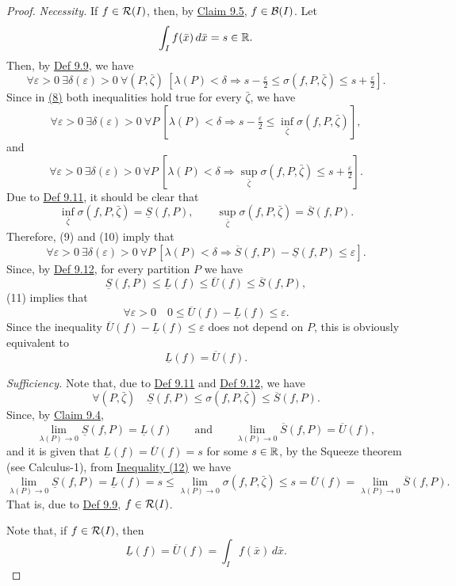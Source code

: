 \begin{proof}
\emph{Necessity.} If $f\in\mathcal{R}(I)$, then, by \hyperref[claim:9.5]{Claim 9.5}, $f\in\mathcal{B}(I)$.
Let
\[
\int_I f(\bar x)\,d\bar x=s\in\mathbb{R}.
\]
Then, by \hyperref[def:9.9]{Def 9.9}, we have
\[
\forall\varepsilon>0\ \exists\delta(\varepsilon)>0\ \forall(P,\bar\zeta)\
[\lambda(P)<\delta\Rightarrow s-\tfrac{\varepsilon}{2}\leq\sigma(f,P,\bar\zeta)\leq s+\tfrac{\varepsilon}{2}].
\tag{8}\label{eq:9:8:1}
\]
Since in \hyperref[eq:9:8:1]{(8)} both inequalities hold true for every $\bar\zeta$, we have
\[
\forall\varepsilon>0\ \exists\delta(\varepsilon)>0\ \forall P\
[\lambda(P)<\delta\Rightarrow s-\tfrac{\varepsilon}{2}\leq\inf_{\bar\zeta}\sigma(f,P,\bar\zeta)],
\tag{9}\label{eq:9:9:1}
\]
and
\[
\forall\varepsilon>0\ \exists\delta(\varepsilon)>0\ \forall P\
[\lambda(P)<\delta\Rightarrow \sup_{\bar\zeta}\sigma(f,P,\bar\zeta)\leq s+\tfrac{\varepsilon}{2}].
\tag{10}\label{eq:9:10:1}
\]
Due to \hyperref[def:9.11]{Def 9.11}, it should be clear that
\[
\inf_{\bar\zeta}\sigma(f,P,\bar\zeta)=\underline{S}(f,P),
\qquad
\sup_{\bar\zeta}\sigma(f,P,\bar\zeta)=\overline{S}(f,P).
\]
Therefore, (9) and (10) imply that
\[
\forall\varepsilon>0\ \exists\delta(\varepsilon)>0\ \forall P\
[\lambda(P)<\delta\Rightarrow \overline{S}(f,P)-\underline{S}(f,P)\leq\varepsilon].
\tag{11}\label{eq:9:11:1}
\]
Since, by \hyperref[def:9.12]{Def 9.12}, for every partition $P$ we have
\[
\underline{S}(f,P)\leq\underline{L}(f)\leq\overline{U}(f)\leq\overline{S}(f,P),
\]
(11) implies that
\[
\forall\varepsilon>0\quad 0\leq\overline{U}(f)-\underline{L}(f)\leq\varepsilon.
\]
Since the inequality $\overline{U}(f)-\underline{L}(f)\leq\varepsilon$ does not depend on $P$, this is obviously equivalent to
\[
\underline{L}(f)=\overline{U}(f).
\]

\emph{Sufficiency.} Note that, due to \hyperref[def:9.11]{Def 9.11} and \hyperref[def:9.12]{Def 9.12}, we have
\[
\forall(P,\bar\zeta)\quad
\underline{S}(f,P)\leq\sigma(f,P,\bar\zeta)\leq\overline{S}(f,P).
\tag{12}\label{eq:9:12:1}
\]
Since, by \hyperref[claim:9.4]{Claim 9.4},
\[
\lim_{\lambda(P)\to0}\underline{S}(f,P)=\underline{L}(f)
\qquad\text{and}\qquad
\lim_{\lambda(P)\to0}\overline{S}(f,P)=\overline{U}(f),
\]
and it is given that $\underline{L}(f)=\overline{U}(f)=s$ for some $s\in\mathbb{R}$, by the Squeeze theorem (see Calculus-1), from \hyperref[eq:9:12:1]{Inequality (12)} we have
\[
\lim_{\lambda(P)\to0}\underline{S}(f,P)=\underline{L}(f)=s
\leq\lim_{\lambda(P)\to0}\sigma(f,P,\bar\zeta)
\leq s=\overline{U}(f)=\lim_{\lambda(P)\to0}\overline{S}(f,P).
\tag{13}\label{eq:9:13:1}
\]
That is, due to \hyperref[def:9.9]{Def 9.9}, $f\in\mathcal{R}(I)$.

Note that, if $f\in\mathcal{R}(I)$, then
\[
\underline{L}(f)=\overline{U}(f)=\int_I f(\bar x)\,d\bar x.
\]
\end{proof}
